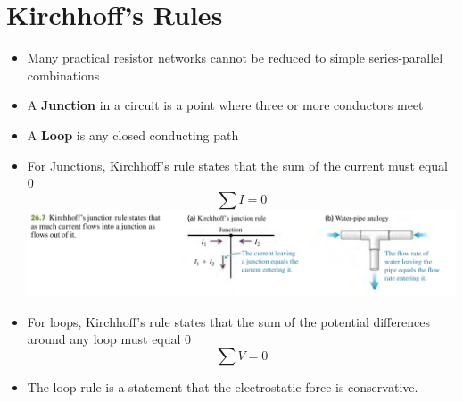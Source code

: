 \documentclass[11pt, a4paper]{article}
\begin{document}
\section[26.2, Kirchhoff's Rules]{Kirchhoff's Rules}
\begin{itemize}
    \item Many practical resistor networks cannot be reduced to simple series-parallel
        combinations
    \item A \textbf{Junction} in a circuit is a point where three or more conductors meet
    \item A \textbf{Loop} is any closed conducting path
    \item For Junctions, Kirchhoff's rule states that the sum of the current must equal 0
        \begin{equation}
            \sum I = 0
        \end{equation}
        \includegraphics[scale=0.65]{images/junction_rule.png}
    \item For loops, Kirchhoff's rule states that the sum of the potential differences
        around any loop must equal 0
        \begin{equation}
            \sum V = 0
        \end{equation}
    \item The loop rule is a statement that the electrostatic force is conservative.
\end{itemize}
\end{document}
